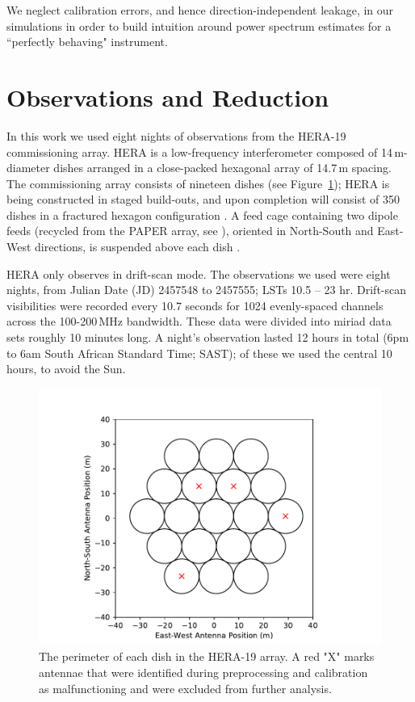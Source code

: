 \documentclass[twocolumn, trackchanges]{aastex61}
\begin{document}
We neglect calibration errors, and hence direction-independent leakage, in our simulations in order to build intuition around power spectrum estimates for a ``perfectly behaving" instrument.  

\section{Observations and Reduction}
\label{sec:obs}

In this work we used eight nights of observations from the HERA-19 commissioning array. HERA is a low-frequency interferometer composed of 14\,m-diameter dishes arranged in a close-packed hexagonal array of 14.7\,m spacing. The commissioning array consists of nineteen dishes (see Figure~\ref{fig:antpos}); HERA is being constructed in staged build-outs, and upon completion will consist of 350 dishes in a fractured hexagon configuration \citep[see][]{DillonParsons16, deBoer17}. A feed cage containing two dipole feeds (recycled from the PAPER array, see \citealt{Parsons.10}), oriented in North-South and East-West directions, is suspended above each dish \citep{Neben.16,Ewall-Wice.16,Thyagarajan.16}.

HERA only observes in drift-scan mode. The observations we used were eight nights, from Julian Date (JD) 2457548 to 2457555; LSTs 10.5 -- 23 hr. Drift-scan visibilities were recorded every 10.7 seconds for 1024 evenly-spaced channels across the 100-200\,MHz bandwidth. These data were divided into {\sc miriad} data sets roughly 10 minutes long. A night's observation lasted 12 hours in total (6pm to 6am South African Standard Time; SAST); of these we used the central 10 hours, to avoid the Sun. 

\begin{figure}
\centering
\hspace{-0.5cm}\includegraphics[scale=0.6]{antpos_hera19.pdf}
\caption{The perimeter of each dish in the HERA-19 array.  A red "X" marks antennae that were identified during preprocessing and calibration as malfunctioning and were excluded from further analysis.}
\label{fig:antpos}
\end{figure}
\end{document}

